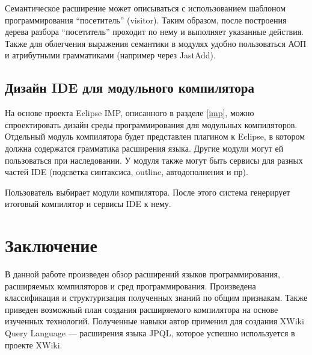 \documentclass[a4paper,12pt,titlepage]{extarticle}
\begin{document}
Семантическое расширение может описываться с использованием шаблоном
программирования ``посетитель'' (visitor). Таким образом, после построения
дерева разбора ``посетитель'' проходит по нему и выполняет указанные действия.
Также для облегчения выражения семантики в модулях удобно пользоваться АОП и
атрибутными грамматиками (например через JastAdd).

\subsection{Дизайн IDE для модульного компилятора}

На основе проекта Eclipse IMP, описанного в разделе \ref{imp}, можно
спроектировать дизайн среды программирования для модульных компиляторов.
Отдельный модуль компилятора будет представлен плагином к Eclipse, в котором
должна содержатся грамматика расширения языка. Другие модули могут ей
пользоваться при наследовании. У модуля также могут быть сервисы для разных
частей IDE (подсветка синтаксиса, outline, автодополнения и пр).

Пользователь выбирает модули компилятора. После этого система генерирует
итоговый компилятор и сервисы IDE к нему.

\section{Заключение}

В данной работе произведен обзор расширений языков программирования,
расширяемых компиляторов и сред программирования. Произведена классификация и
структуризация полученных знаний по общим признакам. Также приведен возможный
план создания расширяемого компилятора на основе изученных технологий.
Полученные навыки автор применил для создания XWiki Query Language ---
расширения языка JPQL, которое успешно используется в проекте XWiki.
 
\small



\end{document}
